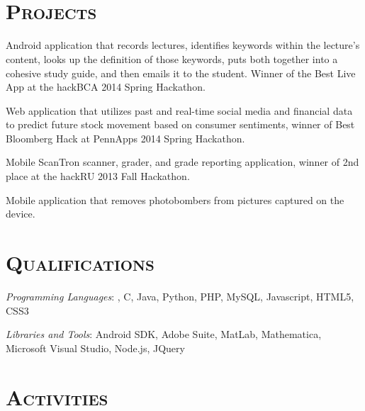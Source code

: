 \begin{resume}
\begin{formatb}
  \\
  \body\\
\end{formatb}

\section{\textsc{Projects}}

\begin{position}
Android application that records lectures, identifies keywords within the lecture's content, looks up the definition of those keywords, puts both together into a cohesive study guide, and then emails it to the student. Winner of the Best Live App at the hackBCA 2014 Spring Hackathon. 
\end{position}

\begin{position}
Web application that utilizes past and real-time social media and financial data to predict future stock movement based on consumer sentiments, winner of Best Bloomberg Hack at PennApps 2014 Spring Hackathon.
\end{position}

\begin{position}
Mobile ScanTron scanner, grader, and grade reporting application, winner of 2nd place at the hackRU 2013 Fall Hackathon.
\end{position}

\begin{position}
Mobile application that removes photobombers from pictures captured on the device.
\end{position}

\section{\textsc{Qualifications}}

\emph{Programming Languages}: \Cplusplus, C, Java, Python, PHP, MySQL, Javascript, HTML5, CSS3

\emph{Libraries and Tools}: Android SDK, Adobe Suite, MatLab, Mathematica, Microsoft Visual Studio, Node.js, JQuery

\section{\textsc{Activities}}


\end{resume}

